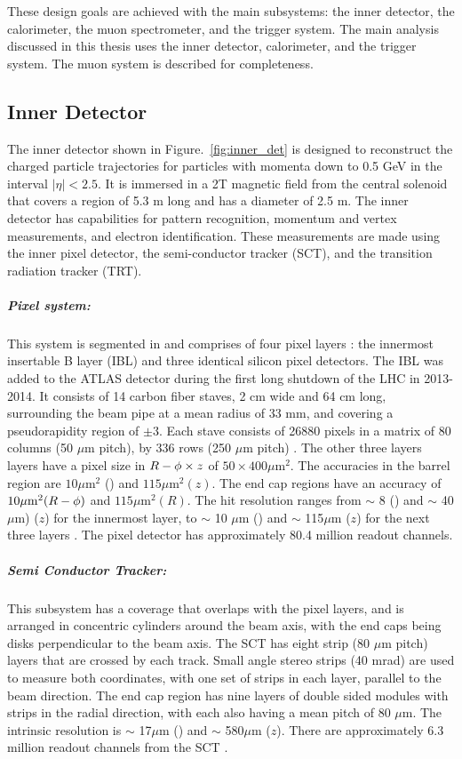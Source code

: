 These design goals are achieved with the main subsystems: the inner detector, the calorimeter, the muon spectrometer, and the trigger system.
The main analysis discussed in this thesis uses the inner detector, calorimeter, and the trigger system.
The muon system is described for completeness.


\subsection{Inner Detector}
The inner detector shown in Figure.~\ref{fig:inner_det} is designed to reconstruct the charged particle trajectories for particles with momenta down to 0.5 GeV in the interval $|\eta| < 2.5$.
It is immersed in a 2T magnetic field from the central solenoid that covers a region of 5.3 m long and has a diameter of 2.5 m.
The inner detector has capabilities for pattern recognition, momentum and vertex measurements, and electron identification.
These measurements are made using the inner pixel detector, the semi-conductor tracker (SCT), and the transition radiation tracker (TRT).


\subparagraph{Pixel system: } This system is segmented in \rphi and comprises of four pixel layers : the innermost insertable B layer (IBL) and three identical silicon pixel detectors.
The IBL was added to the ATLAS detector during the first long shutdown of the LHC in 2013-2014.
It consists of 14 carbon fiber staves, 2 cm wide and 64 cm long, surrounding the beam pipe at a mean radius of 33 mm, and covering a pseudorapidity region of $\pm 3$.
Each stave consists of 26880 pixels in a matrix of 80 columns (50 $\mu$m pitch), by 336 rows (250 $\mu$m pitch) \cite{LaRosa:2016nbd, Capeans:1291633}.
The other three layers layers have a pixel size in $\mbox{$R - \phi$} \times z$ of $50 \times 400 \mu \mathrm{m}^2$.
The accuracies in the barrel region are $10 \mu \mathrm{m}^2$ (\rphi) and $115 \mu \mathrm{m}^2 (z)$.
The end cap regions have an accuracy of $10 \mu \mathrm{m}^2 (\mbox{$R - \phi$}) $ and $115 \mu \mathrm{m}^2 (R)$.
The hit resolution ranges from $\sim$ 8 (\rphi) and $\sim$ 40$\mu$m) ($z$) for the innermost layer, to $\sim$ 10 $\mu$m (\rphi) and $\sim$ 115$\mu$m ($z$) for the next three layers \cite{Aad:2008zzm}.
The pixel detector has approximately 80.4 million readout channels.


\subparagraph{Semi Conductor Tracker:} This subsystem has a coverage that overlaps with the pixel layers, and is arranged in concentric cylinders around the beam axis, with the end caps being disks perpendicular to the beam axis.
The SCT has eight strip (80 $\mu$m pitch) layers that are crossed by each track.
Small angle stereo strips (40 mrad) are used to measure both coordinates, with one set of strips in each layer, parallel to the beam direction.
The end cap region has nine layers of double sided modules with strips in the radial direction, with each also having a mean pitch of 80 $\mu$m.
The intrinsic resolution is $\sim$ 17$\mu$m (\rphi) and $\sim$ 580$\mu$m ($z$).
There are approximately 6.3 million readout channels from the SCT \cite{Aad:2008zzm}.


